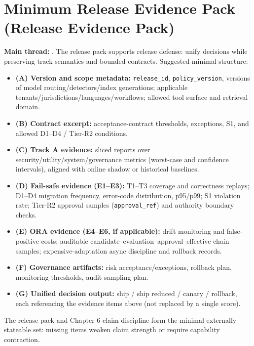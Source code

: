 \documentclass[11pt,a4paper]{report}
\begin{document}
\section{Minimum Release Evidence Pack (Release Evidence Pack)}
\textbf{Main thread:} \EvalFramework{}. The release pack supports release defense: unify decisions while preserving track semantics and bounded contracts. Suggested minimal structure:
\begin{itemize}
  \item \textbf{(A) Version and scope metadata:} \texttt{release\_id}, \texttt{policy\_version}, versions of model routing/detectors/index generations; applicable tenants/jurisdictions/languages/workflows; allowed tool surface and retrieval domain.
  \item \textbf{(B) Contract excerpt:} acceptance-contract thresholds, exceptions, S1, and allowed D1--D4 / Tier-R2 conditions.
  \item \textbf{(C) Track A evidence:} sliced reports over security/utility/system/governance metrics (worst-case and confidence intervals), aligned with online shadow or historical baselines.
  \item \textbf{(D) Fail-safe evidence (E1--E3):} T1--T3 coverage and correctness replays; D1--D4 migration frequency, error-code distribution, p95/p99; S1 violation rate; Tier-R2 approval samples (\texttt{approval\_ref}) and authority boundary checks.
  \item \textbf{(E) ORA evidence (E4--E6, if applicable):} drift monitoring and false-positive costs; auditable candidate–evaluation–approval–effective chain samples; expensive-adaptation async discipline and rollback records.
  \item \textbf{(F) Governance artifacts:} risk acceptance/exceptions, rollback plan, monitoring thresholds, audit sampling plan.
  \item \textbf{(G) Unified decision output:} ship / ship reduced / canary / rollback, each referencing the evidence items above (not replaced by a single score).
\end{itemize}
\noindent The release pack and Chapter 6 claim discipline form the minimal externally stateable set: missing items weaken claim strength or require capability contraction.

\end{document}
